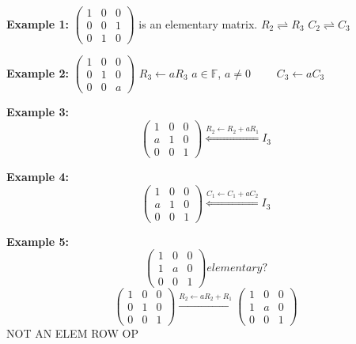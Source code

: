 \documentclass[12pt]{article}
\newcommand{\mF}{{\mathbb{F}}}
\begin{document}
	{\color{Brown}
	\textbf{Example 1: }
	$\begin{pmatrix}
		1 & 0 & 0\\
		0 & 0 & 1\\
		0 & 1 & 0 
	\end{pmatrix}$ is an elementary matrix. 
	$R_2 \rightleftharpoons R_3$ $C_2 \rightleftharpoons C_3$ 
	
	\textbf{Example 2:}
	$\begin{pmatrix}
		1 & 0 & 0\\
		0 & 1 & 0\\
		0 & 0 & a 
	\end{pmatrix}$  
	$R_3 \leftarrow aR_3$ $a \in \mF$, $a \neq 0 \qquad $ 
	$C_3 \leftarrow aC_3$ 

	\textbf{Example 3:}
	\[
		\begin{pmatrix}
			1 & 0 & 0\\
			a & 1 & 0\\
			0 & 0 & 1
		\end{pmatrix}
	\overset{R_2 \leftarrow R_2 + aR_1}{\Longleftarrow} I_3
	\]
	
	\textbf{Example 4:}
	\[
		\begin{pmatrix}
			1 & 0 & 0\\
			a & 1 & 0\\
			0 & 0 & 1
		\end{pmatrix}
	\overset{C_1 \leftarrow C_1 + aC_2}{\Longleftarrow} I_3
	\]

	\textbf{Example 5:}
	\[
		\begin{pmatrix}
			1 & 0 & 0\\
			1 & a & 0\\
			0 & 0 & 1
		\end{pmatrix}
	elementary?
	\]
	\[
		\begin{pmatrix}
			1 & 0 & 0\\
			0 & 1 & 0\\
			0 & 0 & 1
		\end{pmatrix}
		\overset{R_2 \leftarrow aR_2 + R_1}{\longrightarrow}
		\begin{pmatrix}
			1 & 0 & 0\\
			1 & a & 0\\
			0 & 0 & 1
		\end{pmatrix}
	\]
	NOT AN ELEM ROW OP


	
	}
	
\end{document}
